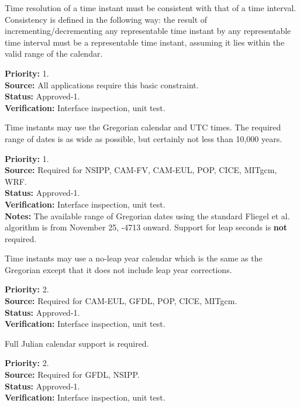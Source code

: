 Time resolution of a time instant must be consistent with that of a time interval.
Consistency is defined in the following way:  the result of incrementing/decrementing 
any representable time instant by any representable time interval must be a representable 
time instant, assuming it lies within the valid range of the calendar.
\begin{reqlist}
{\bf Priority:} 1. \\
{\bf Source:} All applications require this basic constraint.\\
{\bf Status:} Approved-1. \\
{\bf Verification:} Interface inspection, unit test. 
\end{reqlist}

\label{req:calendar}

Time instants may use the Gregorian calendar and UTC times.  The required 
range of dates is as wide as possible, but certainly not less than 10,000 years.
\begin{reqlist}
{\bf Priority:} 1.\\
{\bf Source:} Required for NSIPP, CAM-FV, CAM-EUL, POP, CICE, MITgcm, WRF. \\
{\bf Status:} Approved-1. \\
{\bf Verification:} Interface inspection, unit test. \\
{\bf Notes:} The available range of Gregorian dates using the standard 
Fliegel et al.\cite{Fli68} algorithm is from November 25, -4713 onward.
Support for leap seconds is {\bf not} required.
\end{reqlist}

Time instants may use a no-leap year calendar which is the same as the Gregorian
except that it does not include leap year corrections.  
\begin{reqlist}
{\bf Priority:} 2. \\
{\bf Source:} Required for CAM-EUL, GFDL, POP, CICE, MITgcm. \\
{\bf Status:} Approved-1. \\
{\bf Verification:} Interface inspection, unit test. 
\end{reqlist}

Full Julian calendar support is required.
\begin{reqlist}
{\bf Priority:} 2. \\
{\bf Source:} Required for GFDL, NSIPP. \\
{\bf Status:} Approved-1. \\
{\bf Verification:} Interface inspection, unit test. 
\end{reqlist}

